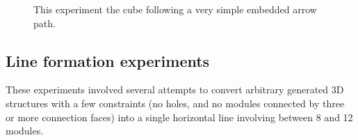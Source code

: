 \begin{figure}[h]
\begin{subfigure}[b]{0.32\linewidth}
	\end{subfigure}
	\begin{subfigure}[b]{0.32\linewidth}
	\end{subfigure}
	
	\caption{This experiment the cube following a very simple embedded arrow path.}
	
	\label{fig:arrowExperiment}
\end{figure}

\subsection{Line formation experiments}
\label{sec:mblocksExperimentsLine}

These experiments involved several attempts to convert arbitrary generated 3D structures with a few constraints (no holes, and no modules connected by three or more connection faces) into a single horizontal line involving between 8 and 12 modules.

